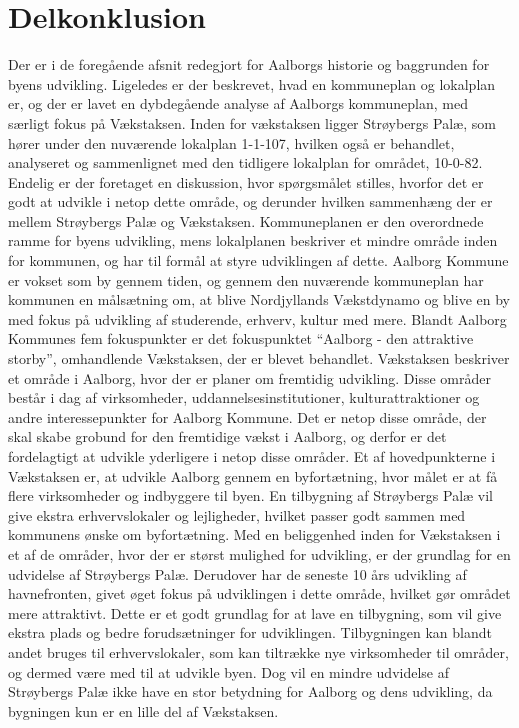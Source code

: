 \section{Delkonklusion}
Der er i de foregående afsnit redegjort for Aalborgs historie og baggrunden for byens udvikling. Ligeledes er der beskrevet, hvad en kommuneplan og lokalplan er, og der er lavet en dybdegående analyse af Aalborgs kommuneplan, med særligt fokus på Vækstaksen. Inden for vækstaksen ligger Strøybergs Palæ, som hører under den nuværende lokalplan 1-1-107, hvilken også er behandlet, analyseret og sammenlignet med den tidligere lokalplan for området, 10-0-82. Endelig er der foretaget en diskussion, hvor spørgsmålet stilles, hvorfor det er godt at udvikle i netop dette område, og derunder hvilken sammenhæng der er mellem Strøybergs Palæ og Vækstaksen.
\newline
\newline
Kommuneplanen er den overordnede ramme for byens udvikling, mens lokalplanen beskriver et mindre område inden for kommunen, og har til formål at styre udviklingen af dette. Aalborg Kommune er vokset som by gennem tiden, og gennem den nuværende kommuneplan
har kommunen en målsætning om, at blive Nordjyllands Vækstdynamo og blive en
by med fokus på udvikling af studerende, erhverv, kultur med mere. 
\newline \indent{     }  Blandt Aalborg Kommunes fem fokuspunkter er det fokuspunktet “Aalborg - den attraktive storby”, omhandlende Vækstaksen, der er blevet behandlet. Vækstaksen beskriver et område i Aalborg, hvor der er planer om fremtidig udvikling. Disse områder består i dag af virksomheder, uddannelsesinstitutioner, kulturattraktioner og andre interessepunkter for Aalborg Kommune. Det er netop disse område, der skal skabe grobund for den fremtidige vækst i Aalborg, og derfor er det fordelagtigt at udvikle yderligere i netop disse områder.
\newline \indent{     }  Et af hovedpunkterne i Vækstaksen er, at udvikle Aalborg gennem en byfortætning, hvor målet er at få flere virksomheder og indbyggere til byen. En tilbygning af Strøybergs Palæ vil give ekstra erhvervslokaler og lejligheder, hvilket passer godt sammen med kommunens ønske om byfortætning. 
\newline
\newline
Med en beliggenhed inden for Vækstaksen i et af de områder, hvor der er størst mulighed for udvikling, er der grundlag for en udvidelse af Strøybergs Palæ. Derudover har de seneste 10 års udvikling af havnefronten, givet øget fokus på udviklingen i dette område, hvilket  gør området mere attraktivt. Dette er et godt grundlag for at lave en tilbygning, som vil give ekstra plads og bedre forudsætninger for udviklingen. Tilbygningen kan blandt andet bruges til erhvervslokaler, som kan tiltrække nye virksomheder til områder, og dermed være med til at udvikle byen.  Dog vil en mindre udvidelse af Strøybergs Palæ ikke have en stor betydning for Aalborg og dens udvikling, da bygningen kun er en lille del af Vækstaksen.